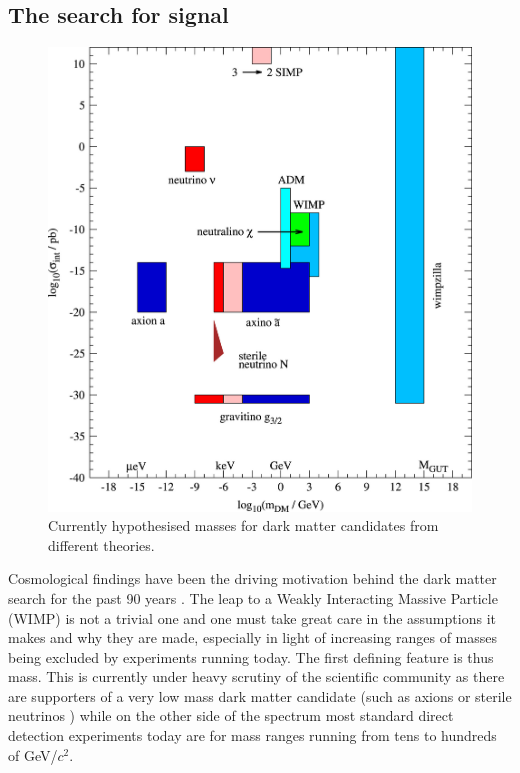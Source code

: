 \documentclass[11pt]{article} %
\begin{document}
\subsection{The search for signal}
\begin{figure}[H]
\centering
\includegraphics[scale=1]{images/mass_ranges.jpg}
\caption{\cite{BAER20151} Currently hypothesised masses for dark matter candidates from different theories.}
\label{fig:mass_ranges}
\end{figure}
\par Cosmological findings have been the driving motivation behind the dark matter search for the past 90 years \cite{bertone2018history}.
The leap to a Weakly Interacting Massive Particle (WIMP) \cite{steigman1984cosmological} is not a trivial one and one must take great care in the assumptions \cite{scherrer1986relic}
it makes and why they are made, especially in light of increasing ranges of masses being excluded by experiments running today.
The first defining feature is thus mass.
This is currently under heavy scrutiny of the scientific community as there are supporters of a very low mass dark matter candidate (such as axions \cite{weinberg1978new} or sterile neutrinos \cite{kusenko2009sterile})
while on the other side of the spectrum most standard direct detection experiments today \cite{Agnes_2015} \cite{McKinsey_2016}  are for mass ranges running from tens to hundreds of GeV/$c^2$.
\end{document}

